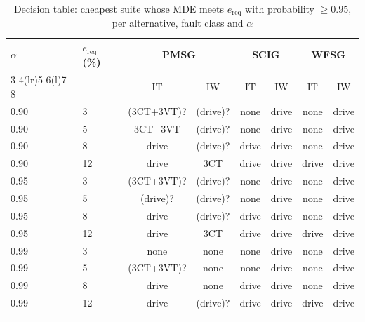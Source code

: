 \begin{table}[t]
\tabsize
\setlength{\tabcolsep}{3pt}
\caption{Decision table: cheapest suite whose MDE meets $e_{\mathrm{req}}$ with probability $\ge0.95$, per alternative, fault class and $\alpha$}\label{tab:decision}
\begin{tabular}{@{}llcccccc@{}}
\toprule
\multirow{2}{*}{$\alpha$} & \multirow{2}{*}{$e_{\mathrm{req}}$ (\%)} & \multicolumn{2}{c}{PMSG} & \multicolumn{2}{c}{SCIG} & \multicolumn{2}{c}{WFSG} \\
\cmidrule(lr){3-4}\cmidrule(lr){5-6}\cmidrule(l){7-8}
 & & IT & IW & IT & IW & IT & IW \\
\midrule
0.90 & 3 & (3CT+3VT)? & (drive)? & none & drive & none & drive \\
0.90 & 5 & 3CT+3VT & (drive)? & none & drive & none & drive \\
0.90 & 8 & drive & (drive)? & drive & drive & none & drive \\
0.90 & 12 & drive & 3CT & drive & drive & drive & drive \\
0.95 & 3 & (3CT+3VT)? & (drive)? & none & drive & none & drive \\
0.95 & 5 & (drive)? & (drive)? & none & drive & none & drive \\
0.95 & 8 & drive & (drive)? & drive & drive & none & drive \\
0.95 & 12 & drive & 3CT & drive & drive & drive & drive \\
0.99 & 3 & none & none & none & drive & none & drive \\
0.99 & 5 & (3CT+3VT)? & none & none & drive & none & drive \\
0.99 & 8 & drive & none & drive & drive & none & drive \\
0.99 & 12 & drive & (drive)? & drive & drive & drive & drive \\
\botrule
\end{tabular}
\end{table}
